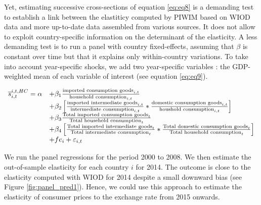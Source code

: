 \documentclass[11pt,a4paper]{article}
\begin{document}
Yet, estimating successive cross-sections of equation \ref{eq:eq8} is a demanding test to establish a link between the elastiticy computed by PIWIM based on WIOD data and more up-to-date data assembled from various sources.
It does not allow to exploit country-specific information on the determinant of the elasticity.
A less demanding test is to run a panel with country fixed-effects, assuming that $\beta$ is constant over time but that it explains only within-country variations. To take into account year-specific shocks, we add two year-specific variables : the GDP-weighted mean of each variable of interest (see equation \ref{eq:eq9}). 


 \begin{equation}
\begin{array}{llll}
\overline{s}_{i,t}^{i,t,HC}= \alpha &+  \beta_1  \frac{\textnormal{imported consumption goods}_{i,t}}{\textnormal{household consumption}_{i,t}} \\
& + \beta_2 \left[ \frac{\textnormal{imported intermediate goods}_{i,t}}{\textnormal{intermediate consumption}_{i,t}}*\frac{\textnormal{domestic consumption goods}_{i,t}}{\textnormal{houshold consumption}_{i,t}}\right] \\ 
&+  \beta_3 \frac{\textnormal{Total imported consumption goods}_t}{\textnormal{Total household consumption}_t} \\
& + \beta_4  \left[ \frac{\textnormal{Total imported intermediate goods}_t}{\textnormal{Total intermediate consumption}_t}*\frac{\textnormal{Total domestic consumption goods}_t}{\textnormal{Total household consumption}_t} \right] \\ 
& +fe_{i}+\varepsilon_{i,t}
\end{array}
\label{eq:eq9}
\end{equation}

We run the panel regressions for the period 2000 to 2008.
We then estimate the out-of-sample elasticity for each country $i$ for 2014. 
The outcome is close to the elasticity computed with WIOD for 2014 despite a small downward bias (see Figure \ref{fig:panel_pred1}).
Hence, we could use this approach to estimate the elasticity of consumer prices to the exchange rate from 2015 onwards.
\end{document}
